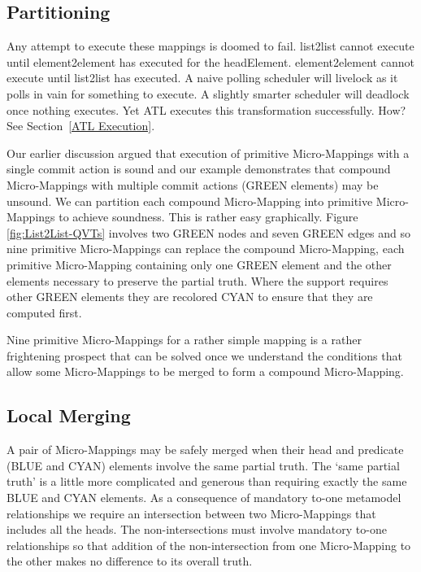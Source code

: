 \documentclass[conference]{IEEEtran}
\begin{document}
\subsection{Partitioning}

Any attempt to execute these mappings is doomed to fail. list2list cannot execute until element2element has executed for the headElement. element2element cannot execute until list2list has executed. A naive polling scheduler will livelock as it polls in vain for something to execute. A slightly smarter scheduler will deadlock once nothing executes. Yet ATL executes this transformation successfully. How? See Section~\ref{ATL Execution}.

Our earlier discussion argued that execution of primitive Micro-Mappings with a single commit action is sound and our example demonstrates that compound Micro-Mappings with multiple commit actions (GREEN elements) may be unsound. We can partition each compound Micro-Mapping into primitive Micro-Mappings to achieve soundness. This is rather easy graphically.  Figure \ref{fig:List2List-QVTs} involves two GREEN nodes and seven GREEN edges and so nine primitive Micro-Mappings can replace the compound Micro-Mapping, each primitive Micro-Mapping containing only one GREEN element and the other elements necessary to preserve the partial truth. Where the support requires other GREEN elements they are recolored CYAN to ensure that they are computed first.%

Nine primitive Micro-Mappings for a rather simple mapping is a rather frightening prospect that can be solved once we understand the conditions that allow some Micro-Mappings to be merged to form a compound Micro-Mapping.

\subsection{Local Merging}\label{Local Merging}

A pair of Micro-Mappings may be safely merged when their head and predicate (BLUE and CYAN) elements involve the same partial truth. The `same partial truth' is a little more complicated and generous than requiring exactly the same BLUE and CYAN elements. As a consequence of mandatory to-one metamodel relationships we require an intersection between two Micro-Mappings that includes all the heads. The non-intersections must involve mandatory to-one relationships so that addition of the non-intersection from one Micro-Mapping to the other makes no difference to its overall truth.
\end{document}
